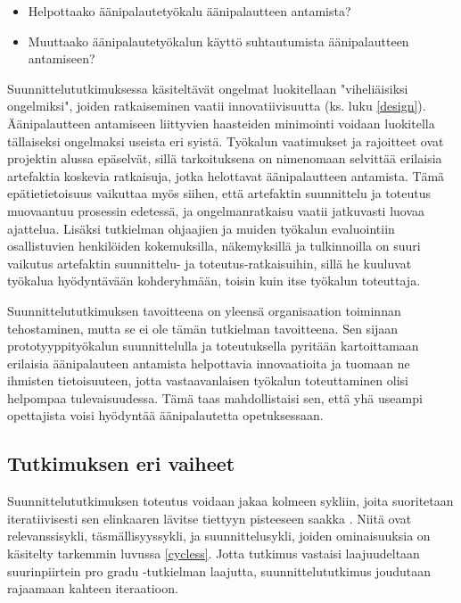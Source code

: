 \documentclass[utf8]{gradu3}
\begin{document}
\begin{itemize}
  \item Helpottaako äänipalautetyökalu äänipalautteen antamista?
  \item Muuttaako äänipalautetyökalun käyttö suhtautumista äänipalautteen antamiseen?
\end{itemize}

Suunnittelututkimuksessa käsiteltävät ongelmat luokitellaan "viheliäisiksi ongelmiksi", joiden ratkaiseminen vaatii innovatiivisuutta (ks. luku \ref{design}). Äänipalautteen antamiseen liittyvien haasteiden minimointi voidaan luokitella tällaiseksi ongelmaksi useista eri syistä. Työkalun vaatimukset ja rajoitteet ovat projektin alussa epäselvät, sillä tarkoituksena on nimenomaan selvittää erilaisia artefaktia koskevia ratkaisuja, jotka helottavat äänipalautteen antamista. Tämä epätietietoisuus vaikuttaa myös siihen, että artefaktin suunnittelu ja toteutus muovaantuu prosessin edetessä, ja ongelmanratkaisu vaatii jatkuvasti luovaa ajattelua. Lisäksi tutkielman ohjaajien ja muiden työkalun evaluointiin osallistuvien henkilöiden kokemuksilla, näkemyksillä ja tulkinnoilla on suuri vaikutus artefaktin suunnittelu- ja toteutus-ratkaisuihin, sillä he kuuluvat työkalua hyödyntävään kohderyhmään, toisin kuin itse työkalun toteuttaja.

Suunnittelututkimuksen tavoitteena on yleensä organisaation toiminnan tehostaminen, mutta se ei ole tämän tutkielman tavoitteena. Sen sijaan prototyyppityökalun suunnittelulla ja toteutuksella pyritään kartoittamaan erilaisia äänipalauteen antamista helpottavia innovaatioita ja tuomaan ne ihmisten tietoisuuteen, jotta vastaavanlaisen työkalun toteuttaminen olisi helpompaa tulevaisuudessa. Tämä taas mahdollistaisi sen, että yhä useampi opettajista voisi hyödyntää äänipalautetta opetuksessaan.

\subsection{Tutkimuksen eri vaiheet}

Suunnittelututkimuksen toteutus voidaan jakaa kolmeen sykliin, joita suoritetaan iteratiivisesti sen elinkaaren lävitse tiettyyn pisteeseen saakka \parencite{cycles}. Niitä ovat relevanssisykli, täsmällisyyssykli, ja suunnittelusykli, joiden ominaisuuksia on käsitelty tarkemmin luvussa \ref{cycless}.  Jotta tutkimus vastaisi laajuudeltaan suurinpiirtein pro gradu -tutkielman laajutta, suunnittelututkimus joudutaan rajaamaan kahteen iteraatioon.
\end{document}
